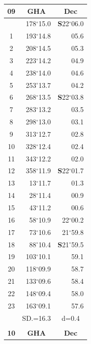 \documentclass[10pt, a4paper]{report}
\begin{document}
\begin{scriptsize}
\begin{tabular*}{0.2\textwidth}[t]{@{\extracolsep{\fill}}|c|rr|}
\hline
\multicolumn{1}{|c|}{\rule{0pt}{2.6ex}\textbf{09}} & \multicolumn{1}{c}{\textbf{GHA}} & \multicolumn{1}{c|}{\textbf{Dec}}\\
\hline\rule{0pt}{2.6ex}\noindent
0 & 178$^\circ$15.0 & \textbf{S}22$^\circ$06.0\\
1 & 193$^\circ$14.8 & 05.6\\
2 & 208$^\circ$14.5 & 05.3\\
3 & 223$^\circ$14.2 & \raisebox{0.24ex}{\boldmath$\cdot$~\boldmath$\cdot$~~}04.9\\
4 & 238$^\circ$14.0 & 04.6\\
5 & 253$^\circ$13.7 & 04.2\\[2Pt]
6 & 268$^\circ$13.5 & \textbf{S}22$^\circ$03.8\\
7 & 283$^\circ$13.2 & 03.5\\
8 & 298$^\circ$13.0 & 03.1\\
9 & 313$^\circ$12.7 & \raisebox{0.24ex}{\boldmath$\cdot$~\boldmath$\cdot$~~}02.8\\
10 & 328$^\circ$12.4 & 02.4\\
11 & 343$^\circ$12.2 & 02.0\\[2Pt]
12 & 358$^\circ$11.9 & \textbf{S}22$^\circ$01.7\\
13 & 13$^\circ$11.7 & 01.3\\
14 & 28$^\circ$11.4 & 00.9\\
15 & 43$^\circ$11.2 & \raisebox{0.24ex}{\boldmath$\cdot$~\boldmath$\cdot$~~}00.6\\
16 & 58$^\circ$10.9 & 22$^\circ$00.2\\
17 & 73$^\circ$10.6 & 21$^\circ$59.8\\[2Pt]
18 & 88$^\circ$10.4 & \textbf{S}21$^\circ$59.5\\
19 & 103$^\circ$10.1 & 59.1\\
20 & 118$^\circ$09.9 & 58.7\\
21 & 133$^\circ$09.6 & \raisebox{0.24ex}{\boldmath$\cdot$~\boldmath$\cdot$~~}58.4\\
22 & 148$^\circ$09.4 & 58.0\\
23 & 163$^\circ$09.1 & 57.6\\
\hline
\rule{0pt}{2.4ex} & \multicolumn{1}{c}{SD.=16.3} & \multicolumn{1}{c|}{d=0.4}\\
\hline
\multicolumn{1}{c}{}\\[-0.5ex]\hline
\multicolumn{1}{|c|}{\rule{0pt}{2.6ex}\textbf{10}} & \multicolumn{1}{c}{\textbf{GHA}} & \multicolumn{1}{c|}{\textbf{Dec}}\\

\end{tabular*}
\end{scriptsize}
\end{document}
